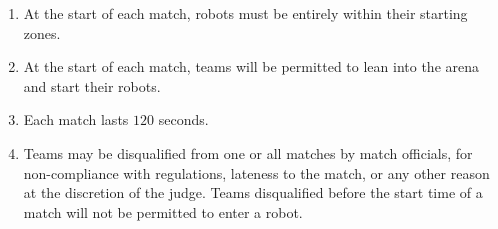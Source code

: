 \begin{enumerate}
  \item At the start of each match, robots must be entirely within their
        starting zones.
  \item At the start of each match, teams will be permitted to lean into the
        arena and start their robots.
  \item Each match lasts $120$ seconds.
  \item Teams may be disqualified from one or all matches by match officials,
        for non-compliance with regulations, lateness to the match, or any other
        reason at the discretion of the judge. Teams disqualified before the
        start time of a match will not be permitted to enter a robot.
\end{enumerate}


